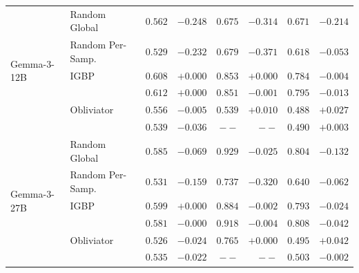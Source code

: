\begin{longtable}{ll|rr|rr|rr}
  \midrule
  \multirow{6}{*}{Gemma-3-12B} & Random Global & $0.562$ & $-0.248$ & $0.675$ & $-0.314$ & $0.671$ & $-0.214$ \\
   & Random Per-Samp. & $0.529$ & $-0.232$ & $0.679$ & $-0.371$ & $0.618$ & $-0.053$ \\
   & IGBP & $0.608$ & $\boldsymbol{+0.000}$ & $0.853$ & $\boldsymbol{+0.000}$ & $0.784$ & $\boldsymbol{-0.004}$ \\
   & \AmbGCE{} & $0.612$ & $+0.000$ & $0.851$ & $-0.001$ & $0.795$ & $-0.013$ \\
   & Obliviator & $0.556$ & $-0.005$ & $\boldsymbol{0.539}$ & $+0.010$ & $\boldsymbol{0.488}$ & $+0.027$ \\
   & \TanGCE{} & $\boldsymbol{0.539}$ & $-0.036$ & $--$ & $--$ & $0.490$ & $+0.003$ \\
  \midrule
  \multirow{6}{*}{Gemma-3-27B} & Random Global & $0.585$ & $-0.069$ & $0.929$ & $-0.025$ & $0.804$ & $-0.132$ \\
   & Random Per-Samp. & $0.531$ & $-0.159$ & $0.737$ & $-0.320$ & $0.640$ & $-0.062$ \\
   & IGBP & $0.599$ & $\boldsymbol{+0.000}$ & $0.884$ & $\boldsymbol{-0.002}$ & $0.793$ & $-0.024$ \\
   & \AmbGCE{} & $0.581$ & $\boldsymbol{-0.000}$ & $0.918$ & $-0.004$ & $0.808$ & $-0.042$ \\
   & Obliviator & $0.526$ & $-0.024$ & $0.765$ & $+0.000$ & $0.495$ & $+0.042$ \\
   & \TanGCE{} & $0.535$ & $-0.022$ & $--$ & $--$ & $0.503$ & $-0.002$ \\
\end{longtable}
